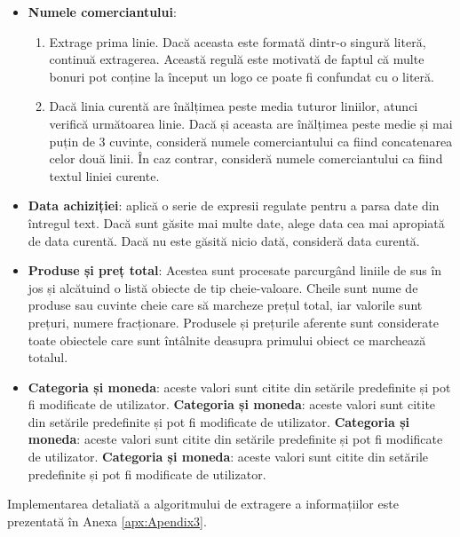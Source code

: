 \begin{itemize}
  \item
  \textbf{Numele comerciantului}:
  \begin{enumerate}
      \item
      Extrage prima linie. Dacă aceasta este formată dintr-o singură literă, continuă extragerea. Această regulă este motivată de faptul că multe bonuri pot conține la început un logo ce poate fi confundat cu o literă.
      \item
      Dacă linia curentă are înălțimea peste media tuturor liniilor, atunci verifică următoarea linie. Dacă și aceasta are înălțimea peste medie și mai puțin de 3 cuvinte, consideră numele comerciantului ca fiind concatenarea celor două linii. În caz contrar, consideră numele comerciantului ca fiind textul liniei curente.
  \end{enumerate}
  \item
  \textbf{Data achiziției}: aplică o serie de expresii regulate pentru a parsa date din întregul text. Dacă sunt găsite mai multe date, alege data cea mai apropiată de data curentă. Dacă nu este găsită nicio dată, consideră data curentă.
  \item
  \textbf{Produse și preț total}: Acestea sunt procesate parcurgând liniile de sus în jos și alcătuind o listă obiecte de tip cheie-valoare. Cheile sunt nume de produse sau cuvinte cheie care să marcheze prețul total, iar valorile sunt prețuri, numere fracționare. Produsele și prețurile aferente sunt considerate toate obiectele care sunt întâlnite deasupra primului obiect ce marchează totalul.
  \item
  \textbf{Categoria și moneda}: aceste valori sunt citite din setările predefinite și pot fi modificate de utilizator.
  \textbf{Categoria și moneda}: aceste valori sunt citite din setările predefinite și pot fi modificate de utilizator.
  \textbf{Categoria și moneda}: aceste valori sunt citite din setările predefinite și pot fi modificate de utilizator.
  \textbf{Categoria și moneda}: aceste valori sunt citite din setările predefinite și pot fi modificate de utilizator.
\end{itemize}

Implementarea detaliată a algoritmului de extragere a informațiilor este prezentată în Anexa \ref{apx:Apendix3}.


